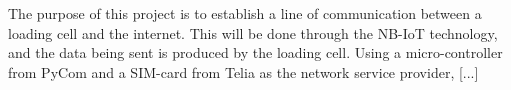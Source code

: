 The purpose of this project is to establish a line of communication between a loading cell and the internet. This will be done through the NB-IoT technology, and the data being sent is produced by the loading cell. Using a micro-controller from PyCom and a SIM-card from Telia as the network service provider, [...]